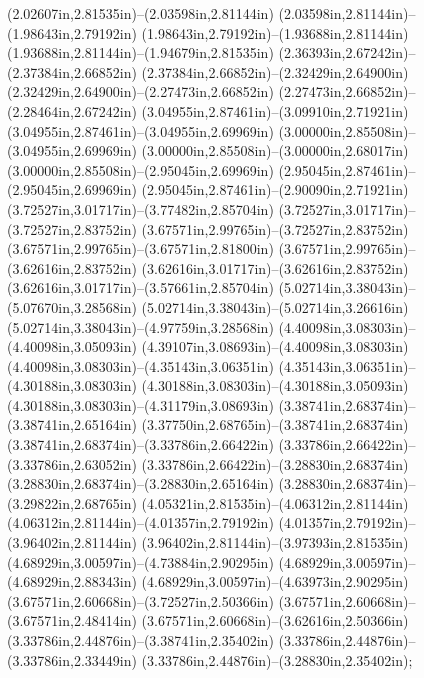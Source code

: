 (2.02607in,2.81535in)--(2.03598in,2.81144in) (2.03598in,2.81144in)--(1.98643in,2.79192in) (1.98643in,2.79192in)--(1.93688in,2.81144in) (1.93688in,2.81144in)--(1.94679in,2.81535in) (2.36393in,2.67242in)--(2.37384in,2.66852in) (2.37384in,2.66852in)--(2.32429in,2.64900in) (2.32429in,2.64900in)--(2.27473in,2.66852in) (2.27473in,2.66852in)--(2.28464in,2.67242in) (3.04955in,2.87461in)--(3.09910in,2.71921in) (3.04955in,2.87461in)--(3.04955in,2.69969in) (3.00000in,2.85508in)--(3.04955in,2.69969in) (3.00000in,2.85508in)--(3.00000in,2.68017in) (3.00000in,2.85508in)--(2.95045in,2.69969in) (2.95045in,2.87461in)--(2.95045in,2.69969in) (2.95045in,2.87461in)--(2.90090in,2.71921in) (3.72527in,3.01717in)--(3.77482in,2.85704in) (3.72527in,3.01717in)--(3.72527in,2.83752in) (3.67571in,2.99765in)--(3.72527in,2.83752in) (3.67571in,2.99765in)--(3.67571in,2.81800in) (3.67571in,2.99765in)--(3.62616in,2.83752in) (3.62616in,3.01717in)--(3.62616in,2.83752in) (3.62616in,3.01717in)--(3.57661in,2.85704in) (5.02714in,3.38043in)--(5.07670in,3.28568in) (5.02714in,3.38043in)--(5.02714in,3.26616in) (5.02714in,3.38043in)--(4.97759in,3.28568in) (4.40098in,3.08303in)--(4.40098in,3.05093in) (4.39107in,3.08693in)--(4.40098in,3.08303in) (4.40098in,3.08303in)--(4.35143in,3.06351in) (4.35143in,3.06351in)--(4.30188in,3.08303in) (4.30188in,3.08303in)--(4.30188in,3.05093in) (4.30188in,3.08303in)--(4.31179in,3.08693in) (3.38741in,2.68374in)--(3.38741in,2.65164in) (3.37750in,2.68765in)--(3.38741in,2.68374in) (3.38741in,2.68374in)--(3.33786in,2.66422in) (3.33786in,2.66422in)--(3.33786in,2.63052in) (3.33786in,2.66422in)--(3.28830in,2.68374in) (3.28830in,2.68374in)--(3.28830in,2.65164in) (3.28830in,2.68374in)--(3.29822in,2.68765in) (4.05321in,2.81535in)--(4.06312in,2.81144in) (4.06312in,2.81144in)--(4.01357in,2.79192in) (4.01357in,2.79192in)--(3.96402in,2.81144in) (3.96402in,2.81144in)--(3.97393in,2.81535in) (4.68929in,3.00597in)--(4.73884in,2.90295in) (4.68929in,3.00597in)--(4.68929in,2.88343in) (4.68929in,3.00597in)--(4.63973in,2.90295in) (3.67571in,2.60668in)--(3.72527in,2.50366in) (3.67571in,2.60668in)--(3.67571in,2.48414in) (3.67571in,2.60668in)--(3.62616in,2.50366in) (3.33786in,2.44876in)--(3.38741in,2.35402in) (3.33786in,2.44876in)--(3.33786in,2.33449in) (3.33786in,2.44876in)--(3.28830in,2.35402in);
